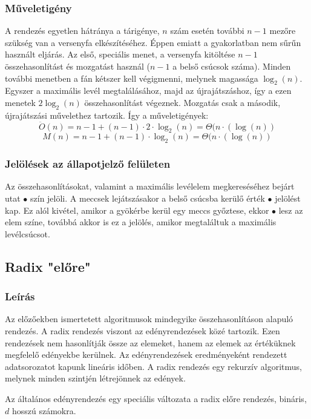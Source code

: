 \documentclass{elteikthesis}
\begin{document}
\subsubsection{Műveletigény}
A rendezés egyetlen hátránya a tárigénye, $n$ szám esetén további $n-1$ mezőre szükség van a versenyfa elkészítéséhez. Éppen emiatt a gyakorlatban nem sűrűn használt eljárás. Az első, speciális menet, a versenyfa kitöltése $n-1$ összehasonlítást és mozgatást használ ($n-1$ a belső csúcsok száma). Minden további menetben a fán kétszer kell végigmenni, melynek magassága $\log_2(n)$. Egyszer a maximális levél megtalálásához, majd az újrajátszáshoz, így a ezen menetek $2\log_2(n)$ összehasonlítást végeznek. Mozgatás csak a második, újrajátszási művelethez tartozik. Így a műveletigények:
$$\ddot{O}(n)=n-1+(n-1)\cdot2\cdot\log_2(n)=\Theta(n\cdot(\log(n))$$
$$M(n)=n-1+(n-1)\cdot\log_2(n)=\Theta(n\cdot(\log(n))$$
\subsubsection{Jelölések az állapotjelző felületen}
Az összehasonlításokat, valamint a maximális levélelem megkereséséhez bejárt utat \textcolor{swap}{\Huge$\bullet$} szín jelöli. A meccsek lejátszásakor a belső csúcsba kerülő érték \textcolor{select}{\Huge$\bullet$} jelölést kap. Ez alól kivétel, amikor a gyökérbe kerül egy meccs győztese, ekkor \textcolor{done}{\Huge$\bullet$} lesz az elem színe, továbbá akkor is ez a jelölés, amikor megtaláltuk a maximális levélcsúcsot.

\subsection{Radix "előre"}
\subsubsection{Leírás}
Az előzőekben ismertetett algoritmusok mindegyike összehasonlításon alapuló rendezés. A radix rendezés viszont az edényrendezések közé tartozik. Ezen rendezések nem hasonlítják össze az elemeket, hanem az elemek az értéküknek megfelelő edényekbe kerülnek. Az edényrendezések eredményeként rendezett adatsorozatot kapunk lineáris időben. 
A radix rendezés egy rekurzív algoritmus, melynek minden szintjén létrejönnek az edények.\par
Az általános edényrendezés egy speciális változata a radix előre rendezés, bináris, $d$ hosszú számokra.\par
\end{document}
